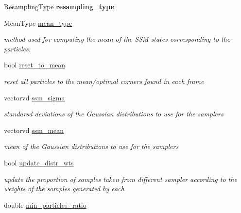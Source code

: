 \begin{DoxyCompactItemize}
\item 
\hypertarget{structPFParams_a160749cf0fed75589b7cd845c630bbb6}{Resampling\-Type {\bfseries resampling\-\_\-type}}\label{structPFParams_a160749cf0fed75589b7cd845c630bbb6}

\item 
Mean\-Type \hyperlink{structPFParams_adef741dc9861c4a22ee8543d0b383221}{mean\-\_\-type}
\begin{DoxyCompactList}\small\item\em method used for computing the mean of the S\-S\-M states corresponding to the particles. \end{DoxyCompactList}\item 
\hypertarget{structPFParams_aae13de4248a029114bf17d63938dd944}{bool \hyperlink{structPFParams_aae13de4248a029114bf17d63938dd944}{reset\-\_\-to\-\_\-mean}}\label{structPFParams_aae13de4248a029114bf17d63938dd944}

\begin{DoxyCompactList}\small\item\em reset all particles to the mean/optimal corners found in each frame \end{DoxyCompactList}\item 
\hypertarget{structPFParams_ad65f3018c877404441b6f9c0d00ec375}{vectorvd \hyperlink{structPFParams_ad65f3018c877404441b6f9c0d00ec375}{ssm\-\_\-sigma}}\label{structPFParams_ad65f3018c877404441b6f9c0d00ec375}

\begin{DoxyCompactList}\small\item\em standarsd deviations of the Gaussian distributions to use for the samplers \end{DoxyCompactList}\item 
\hypertarget{structPFParams_a8422bed02812ceb7c30c2b0fa6ba9e67}{vectorvd \hyperlink{structPFParams_a8422bed02812ceb7c30c2b0fa6ba9e67}{ssm\-\_\-mean}}\label{structPFParams_a8422bed02812ceb7c30c2b0fa6ba9e67}

\begin{DoxyCompactList}\small\item\em mean of the Gaussian distributions to use for the samplers \end{DoxyCompactList}\item 
\hypertarget{structPFParams_a350d30c222b3fd596fa643d6627036d8}{bool \hyperlink{structPFParams_a350d30c222b3fd596fa643d6627036d8}{update\-\_\-distr\-\_\-wts}}\label{structPFParams_a350d30c222b3fd596fa643d6627036d8}

\begin{DoxyCompactList}\small\item\em update the proportion of samples taken from different sampler according to the weights of the samples generated by each \end{DoxyCompactList}\item 
\hypertarget{structPFParams_a16a7f4688337858b1ef814f08956afba}{double \hyperlink{structPFParams_a16a7f4688337858b1ef814f08956afba}{min\-\_\-particles\-\_\-ratio}}\label{structPFParams_a16a7f4688337858b1ef814f08956afba}


\end{DoxyCompactItemize}
